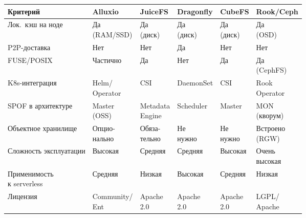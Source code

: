 \begin{table}[htbp]
\centering
\begingroup
\setlength{\tabcolsep}{1.5pt}
\renewcommand{\arraystretch}{1.15}
\renewcommand{\tabularxcolumn}[1]{m{#1}}
\tablebodyfont
\begin{tabularx}{\textwidth}{|>{\raggedright\arraybackslash}m{31mm}|*{5}{>{\centering\arraybackslash}X|}}
\hline
\textbf{Критерий} & \textbf{Alluxio} & \textbf{JuiceFS} & \textbf{Dragonfly} & \textbf{CubeFS} & \textbf{Rook/Ceph} \\ \hline
Лок.\ кэш на ноде        & \shortstack{Да\\(RAM/SSD)} & \shortstack{Да\\(диск)} & \shortstack{Да\\(диск)} & \shortstack{Да\\(диск)} & \shortstack{Да\\(OSD)} \\ \hline
P2P-доставка              & Нет & Нет & Да & Нет & Нет \\ \hline
FUSE/POSIX                & Частично & Да & Нет & Да & \shortstack{Да\\(CephFS)} \\ \hline
K8s-интеграция            & \shortstack{Helm/\\Operator} & CSI & DaemonSet & CSI & \shortstack{Rook\\Operator} \\ \hline
SPOF в архитектуре        & \shortstack{Master\\(OSS)} & \shortstack{Metadata\\Engine} & Scheduler & Master & \shortstack{MON\\(кворум)} \\ \hline
Объектное хранилище       & \shortstack{Опцио-\\нально} & \shortstack{Обяза-\\тельно} & \shortstack{Не\\нужно} & \shortstack{Не\\нужно} & \shortstack{Встроено\\(RGW)} \\ \hline
Сложность эксплуатации    & Высокая & Средняя & Средняя & Высокая & \shortstack{Очень\\высокая} \\ \hline
\shortstack[l]{Применимость\\к serverless} & Средняя & Низкая & Высокая & Средняя & Низкая \\ \hline
Лицензия                  & \shortstack{Community/\\Ent} & \shortstack{Apache\\2.0} & \shortstack{Apache\\2.0} & \shortstack{Apache\\2.0} & \shortstack{LGPL/\\Apache} \\
\hline
\end{tabularx}
\endgroup
\end{table}

